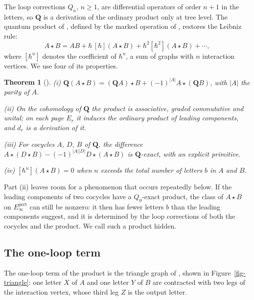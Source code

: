 \documentclass[11pt]{article}
\numberwithin{equation}{section}
\numberwithin{figure}{section}
\numberwithin{table}{section}
\newtheorem{theorem}{Theorem}[section]
\theoremstyle{definition}
\newcommand{\Qp}{\mathbf Q}
\newcommand{\Ep}{E_\infty^{\mathrm{pert}}}
\begin{document}
The loop corrections $Q_n$, $n\ge1$, are differential operators of order $n+1$ in the letters, so $\Qp$ is a derivation of the ordinary product only at tree level. The quantum product of \cite[Equation~(6.11)]{LLCh}, defined by the marked operation of \cite[Sections~4.3 and 4.5]{higher}, restores the Leibniz rule:
\begin{equation}\label{eq-star}
A\star B=AB+\hbar\,[\hbar](A\star B)+\hbar^2[\hbar^2](A\star B)+\cdots,
\end{equation}
where $[\hbar^n]$ denotes the coefficient of $\hbar^n$, a sum of graphs with $n$ interaction vertices. We use four of its properties.

\begin{theorem}[]\label{thm-LLCh}
\emph{(i)} $\Qp(A\star B)=(\Qp A)\star B+(-1)^{|A|}A\star(\Qp B)$, with $|A|$ the parity of $A$.

\emph{(ii)} On the cohomology of $\Qp$ the product is associative, graded commutative and unital; on each page $E_r$ it induces the ordinary product of leading components, and $d_r$ is a derivation of it.

\emph{(iii)} For cocycles $A$, $D$, $B$ of $\Qp$, the difference $A\star(D\star B)-(-1)^{|A||D|}D\star(A\star B)$ is $\Qp$-exact, with an explicit primitive.

\emph{(iv)} $[\hbar^n](A\star B)=0$ when $n$ exceeds the total number of letters $b$ in $A$ and $B$.
\end{theorem}

Part (ii) leaves room for a phenomenon that occurs repeatedly below. If the leading components of two cocycles have a $Q_0$-exact product, the class of $A\star B$ on $\Ep$ can still be nonzero: it then has fewer letters $b$ than the leading components suggest, and it is determined by the loop corrections of both the cocycles and the product. We call such a product hidden.

\subsection{The one-loop term}\label{sec-product-oneloop}

The one-loop term of the product is the triangle graph of \cite[Equation~(6.28)]{LLCh}, shown in Figure~\ref{fig-triangle}: one letter $X$ of $A$ and one letter $Y$ of $B$ are contracted with two legs of the interaction vertex, whose third leg $Z$ is the output letter.
\end{document}
